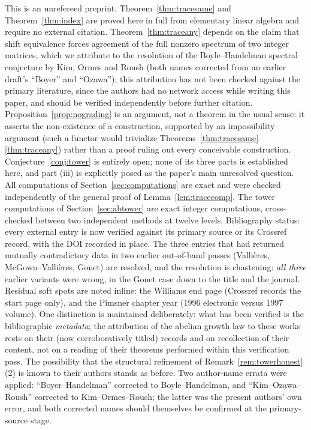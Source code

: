 \documentclass[11pt]{amsart}
\numberwithin{equation}{section}
\theoremstyle{definition}
\theoremstyle{remark}
\begin{document}
This is an unrefereed preprint. Theorem~\ref{thm:tracesame} and Theorem~\ref{thm:index}
are proved here in full from elementary linear algebra and require no external citation.
Theorem~\ref{thm:traceany} depends on the claim that shift equivalence forces agreement
of the full nonzero spectrum of two integer matrices, which we attribute to the
resolution of the Boyle--Handelman spectral conjecture by Kim, Ormes and Roush (both
names corrected from an earlier draft's ``Boyer'' and ``Ozawa''); this
attribution has not been checked against the primary literature, since the authors had
no network access while writing this paper, and should be verified independently before
further citation. Proposition~\ref{prop:nograding} is an argument, not a theorem in the
usual sense: it asserts the non-existence of a construction, supported by an
impossibility argument (such a functor would trivialize
Theorems~\ref{thm:tracesame}--\ref{thm:traceany}) rather than a proof ruling out every
conceivable construction. Conjecture~\ref{conj:tower} is entirely open; none of its three
parts is established here, and part (iii) is explicitly posed as the paper's main
unresolved question. All computations of Section~\ref{sec:computations} are exact and
were checked independently of the general proof of Lemma~\ref{lem:tracecomp}. The tower
computations of Section~\ref{sec:abtower} are exact integer computations, cross-checked
between two independent methods at twelve levels. Bibliography status: every external
entry is now verified against its primary source or its Crossref record, with the DOI
recorded in place. The three entries that had returned mutually contradictory data in
two earlier out-of-band passes (Vallières, McGown--Vallières, Gonet) are resolved, and
the resolution is chastening: \emph{all three} earlier variants were wrong, in the
Gonet case down to the title and the journal. Residual soft spots are noted inline:
the Williams end page (Crossref records the start page only), and the
Pimsner chapter year (1996 electronic versus 1997 volume). One distinction is
maintained deliberately: what has been verified is the bibliographic \emph{metadata};
the attribution of the abelian growth law to these works rests on their (now
corroboratively titled) records and on recollection of their content, not on a reading
of their theorems performed within this verification pass. The possibility that the
structural refinement of Remark~\ref{rem:towerhonest}(2) is known to their authors
stands as before. Two author-name errata were applied: ``Boyer--Handelman'' corrected to
Boyle--Handelman, and ``Kim--Ozawa--Roush'' corrected to Kim--Ormes--Roush; the latter
was the present authors' own error, and both corrected names should themselves be
confirmed at the primary-source stage.
\end{document}
